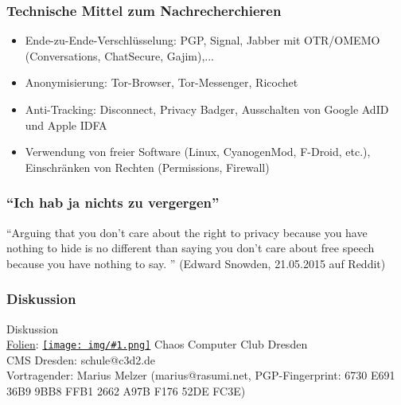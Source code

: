 \documentclass[12pt, xcolor={svgnames,table}]{beamer}
\newcommand{\cc}[1]{\texttt{[image: img/\#1.png]}\hspace{1mm}}
\begin{document}
\begin{frame}
    \frametitle{Technische Mittel zum Nachrecherchieren}
    \footnotesize
    \begin{itemize}
      \item Ende-zu-Ende-Verschlüsselung: PGP, Signal, Jabber mit OTR/OMEMO (Conversations, ChatSecure, Gajim),...
      \item Anonymisierung: Tor-Browser, Tor-Messenger, Ricochet
      \item Anti-Tracking: Disconnect, Privacy Badger, Ausschalten von Google AdID und Apple IDFA
      \item Verwendung von freier Software (Linux, CyanogenMod, F-Droid, etc.), Einschränken von Rechten (Permissions, Firewall)
    \end{itemize}
\end{frame}

\begin{frame}
    \frametitle{``Ich hab ja nichts zu vergergen''}
    \begin{center}
      ``Arguing that you don't care about the right to privacy because you have nothing to hide is no different than saying you don't care about free speech because you have nothing to say. ''
      (Edward Snowden, 21.05.2015 auf Reddit)
    \end{center}
\end{frame}

\begin{frame}
  \frametitle{Diskussion}
  \begin{center}
    {\Large Diskussion}\\
    \vspace{4mm}
    \href{https://github.com/c3d2/cms}{Folien}: \href{https://creativecommons.org/licenses/by-sa/4.0/}{\cc{by-sa}} Chaos Computer Club Dresden \\
    CMS Dresden: schule@c3d2.de\\
    \vspace{3mm}
    Vortragender: Marius Melzer (marius@rasumi.net, PGP-Fingerprint: 6730 E691 36B9 9BB8 FFB1 2662 A97B F176 52DE FC3E)
  \end{center}
\end{frame}
\end{document}
